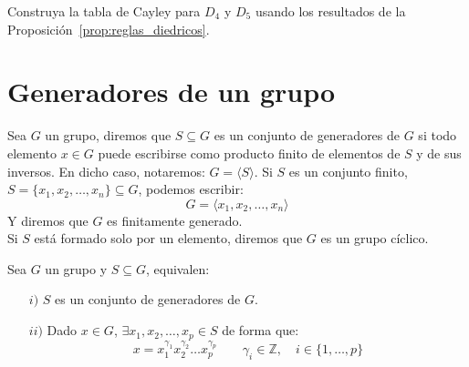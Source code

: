 \begin{ejercicio*}
    Construya la tabla de Cayley para $D_4$ y $D_5$ usando los resultados de la Proposición~\ref{prop:reglas_diedricos}.
\end{ejercicio*}

\section{Generadores de un grupo}
\begin{definicion}
    Sea $G$ un grupo, diremos que $S\subseteq G$ es un conjunto de generadores de $G$ si todo elemento $x\in G$ puede escribirse como producto finito de elementos de $S$ y de sus inversos. En dicho caso, notaremos: $G = \langle S \rangle $.\newline
    Si $S$ es un conjunto finito, $S= \{x_1,x_2,\ldots,x_n\}\subseteq G$, podemos escribir:
    \begin{equation*}
        G = \langle x_1,x_2,\ldots,x_n \rangle 
    \end{equation*}
    Y diremos que $G$ es finitamente generado.\\
    \noindent
    Si $S$ está formado solo por un elemento, diremos que $G$ es un grupo cíclico.
\end{definicion}

\begin{observacion}
    Sea $G$ un grupo y $S\subseteq G$, equivalen:
    \begin{enumerate}
        \item[$i)$] $S$ es un conjunto de generadores de $G$.
        \item[$ii)$] Dado $x\in G$, $\exists x_1,x_2,\ldots,x_p \in S$ de forma que:
            \begin{equation*}
                x = x_1^{\gamma_1}x_2^{\gamma_2} \ldots x_p^{\gamma_p} \qquad \gamma_i \in  \mathbb{Z}, \quad i \in \{1,\ldots,p\}
            \end{equation*}
    \end{enumerate}
\end{observacion}

